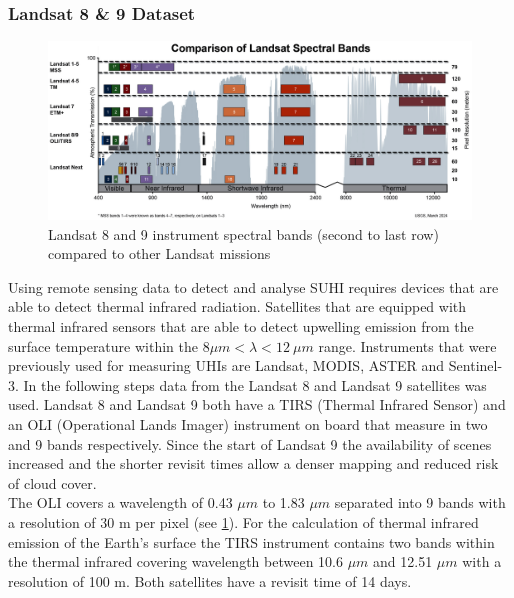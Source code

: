 \documentclass[12pt,a4paper, english,twoside]{scrartcl}
\begin{document}
    \subsubsection{Landsat 8 \& 9 Dataset}\label{sec:landsat}
      \begin{figure}[htbp]
       \begin{center}
         \includegraphics[width=\textwidth]{img/LandsatSpectralBands.png}
       \end{center}
       \caption{Landsat 8 and 9 instrument spectral bands (second to last row) compared to other Landsat missions\autocite{USGSWebsite}\label{fig:lsspectral}}
      \end{figure}
      \noindent
      Using remote sensing data to detect and analyse \gls{SUHI} requires devices that are able to detect thermal infrared radiation. 
      Satellites that are equipped with thermal infrared sensors that are able to detect upwelling emission from the surface temperature within the $ 8\mu m < \lambda < 12\ \mu m $ range. 
      Instruments that were previously used for measuring \glspl{UHI} are Landsat, MODIS, ASTER and Sentinel-3. 
      In the following steps data from the Landsat 8 and Landsat 9 satellites was used. 
      Landsat 8 and Landsat 9 both have a TIRS (Thermal Infrared Sensor) and an OLI (Operational Lands Imager) instrument on board that measure in two and 9 bands respectively.
      Since the start of Landsat 9 the availability of scenes increased and the shorter revisit times allow a denser mapping and reduced risk of cloud cover. \\ 
      The OLI covers a wavelength of 0.43 $\mu m$ to 1.83 $\mu m$ separated into 9 bands with a resolution of 30 m per pixel (see \cref{fig:lsspectral}). 
      For the calculation of thermal infrared emission of the Earth's surface the TIRS instrument contains two bands within the thermal infrared covering wavelength between 10.6 $\mu m$ and 12.51 $\mu m$ with a resolution of 100 m.
      Both satellites have a revisit time of 14 days. 
\end{document}
